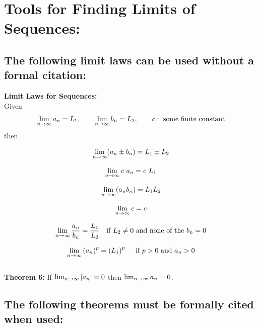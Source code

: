 \documentclass[10pt]{article}
\begin{document}
\pagebreak

\section*{Tools for Finding Limits of Sequences:}\label{limitlaws}

\subsection*{The following limit laws can be used without a formal citation:}
\textbf{Limit Laws for Sequences:}\\
Given 
\[
\lim_{n\rightarrow\infty} a_n = L_1, \qquad \lim_{n\rightarrow\infty} b_n = L_2, \qquad c:\text{ some finite constant}
\]
then

\[ \lim_{n\rightarrow\infty} ( a_n \pm b_n) = L_1 \pm L_2\]

\[ \lim_{n\rightarrow\infty} c\ a_n = c\ L_1\]

\[ \lim_{n\rightarrow\infty} (a_n b_n) = L_1 L_2\]

\[ \lim_{n\rightarrow\infty} c = c\]



\[ \lim_{n\rightarrow\infty} \frac{a_n}{b_n} = \frac{L_1}{L_2} \quad \text{if } L_2 \neq 0 \text{ and none of the } b_n = 0\]

\[ \lim_{n\rightarrow\infty} \left(a_n\right)^p = \left(L_1\right)^p \quad \text{ if } p>0 \text{ and } a_n > 0\]
~\\

\textbf{Theorem 6:} If \(\lim_{n\rightarrow\infty} | a_n | = 0\) then \(\lim_{n\rightarrow\infty} a_n = 0\).


\vspace*{.1in}

\subsection*{The following theorems must be formally cited when used:}



\end{document}
